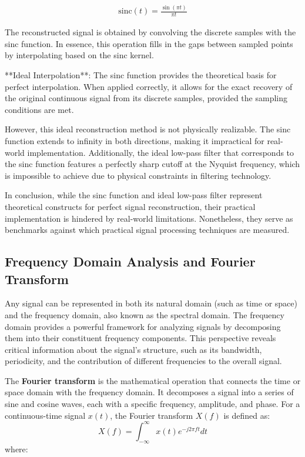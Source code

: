 \begin{align}
  \text{sinc}(t) = \frac{\sin(\pi t)}{\pi t}
\end{align}

The reconstructed signal is obtained by convolving the discrete samples with the sinc function. In essence, this operation fills in the gaps between sampled points by interpolating based on the sinc kernel. 

**Ideal Interpolation**: The sinc function provides the theoretical basis for perfect interpolation. When applied correctly, it allows for the exact recovery of the original continuous signal from its discrete samples, provided the sampling conditions are met.

However, this ideal reconstruction method is not physically realizable. The sinc function extends to infinity in both directions, making it impractical for real-world implementation. Additionally, the ideal low-pass filter that corresponds to the sinc function features a perfectly sharp cutoff at the Nyquist frequency, which is impossible to achieve due to physical constraints in filtering technology.

In conclusion, while the sinc function and ideal low-pass filter represent theoretical constructs for perfect signal reconstruction, their practical implementation is hindered by real-world limitations. Nonetheless, they serve as benchmarks against which practical signal processing techniques are measured.




\subsection{Frequency Domain Analysis and Fourier Transform}

Any signal can be represented in both its natural domain (such as time or space) and the frequency domain, also known as the spectral domain. The frequency domain provides a powerful framework for analyzing signals by decomposing them into their constituent frequency components. This perspective reveals critical information about the signal's structure, such as its bandwidth, periodicity, and the contribution of different frequencies to the overall signal.

The \textbf{Fourier transform} is the mathematical operation that connects the time or space domain with the frequency domain. It decomposes a signal into a series of sine and cosine waves, each with a specific frequency, amplitude, and phase. For a continuous-time signal \( x(t) \), the Fourier transform \( X(f) \) is defined as:
\[
X(f) = \int_{-\infty}^{\infty} x(t) e^{-j2\pi ft} dt
\]
where:

